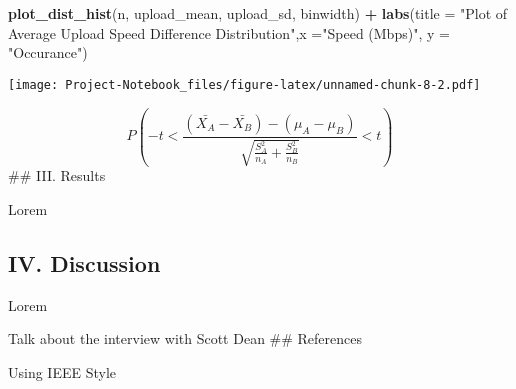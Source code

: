 \documentclass[
]{article}
\newenvironment{Shaded}{\begin{snugshade}}{\end{snugshade}}
\newcommand{\AttributeTok}[1]{\textcolor[rgb]{0.13,0.29,0.53}{#1}}
\newcommand{\FunctionTok}[1]{\textcolor[rgb]{0.13,0.29,0.53}{\textbf{#1}}}
\newcommand{\NormalTok}[1]{#1}
\newcommand{\SpecialCharTok}[1]{\textcolor[rgb]{0.81,0.36,0.00}{\textbf{#1}}}
\newcommand{\StringTok}[1]{\textcolor[rgb]{0.31,0.60,0.02}{#1}}
\begin{document}
\begin{Shaded}
\begin{Highlighting}[]
\FunctionTok{plot\_dist\_hist}\NormalTok{(n, upload\_mean, upload\_sd, binwidth) }\SpecialCharTok{+} \FunctionTok{labs}\NormalTok{(}\AttributeTok{title =} \StringTok{"Plot of Average Upload Speed Difference Distribution"}\NormalTok{,}\AttributeTok{x =}\StringTok{"Speed (Mbps)"}\NormalTok{, }\AttributeTok{y =} \StringTok{"Occurance"}\NormalTok{)}
\end{Highlighting}
\end{Shaded}

\texttt{[image: Project-Notebook\_files/figure-latex/unnamed-chunk-8-2.pdf]}

\[
\begin{equation}
P(-t < \frac{(\bar{X_{A}} - \bar{X_{B}}) - (\mu_A - \mu_B) }{\sqrt{\frac{S_A^2}{n_A} + \frac{S_B^2}{n_B}}} < t)
\end{equation}
\] \#\# III. Results

Lorem

\subsection{IV. Discussion}\label{iv.-discussion}

Lorem

Talk about the interview with Scott Dean \#\# References

Using IEEE Style
\end{document}
